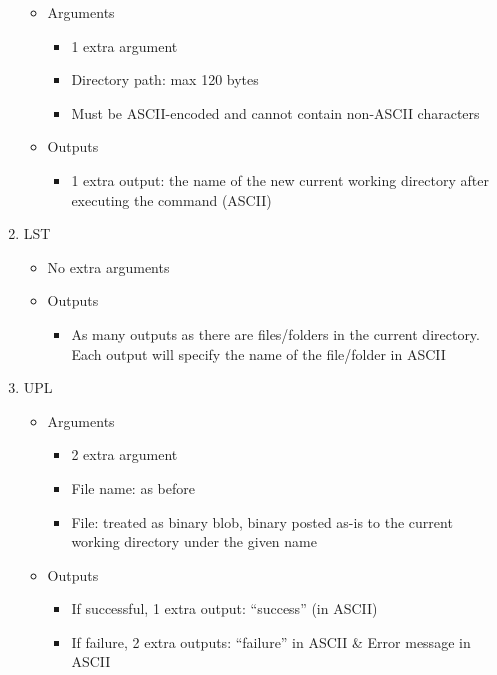 \documentclass[12pt]{article}
\begin{document}
\begin{enumerate}
    \begin{itemize}
        \item Arguments
        \begin{itemize}
            \item 1 extra argument
            \item Directory path: max 120 bytes
            \item Must be ASCII-encoded and cannot contain non-ASCII characters
        \end{itemize}
        \item Outputs
        \begin{itemize}
           \item 1 extra output: the name of the new current working directory after executing the command (ASCII)
        \end{itemize}
    \end{itemize}
    \item LST 
    \begin{itemize}
        \item No extra arguments
        \item Outputs
        \begin{itemize}
           \item As many outputs as there are files/folders in the current directory. Each output will specify the name of the file/folder in ASCII
        \end{itemize}
    \end{itemize}
    \item UPL
    \begin{itemize}
        \item Arguments
        \begin{itemize}
            \item 2 extra argument
            \item File name: as before
            \item File: treated as binary blob, binary posted as-is to the current working directory under the given name
        \end{itemize}
        \item Outputs
        \begin{itemize}
           \item If successful, 1 extra output: “success” (in ASCII)
           \item If failure, 2 extra outputs: “failure” in ASCII \& Error message in ASCII
        \end{itemize}

\end{itemize}
\end{enumerate}
\end{document}
